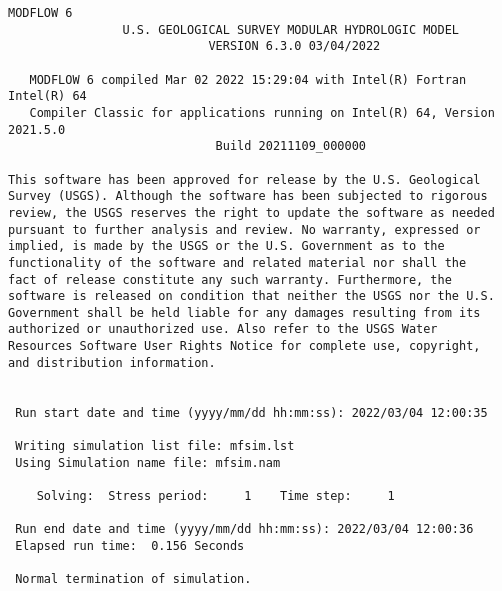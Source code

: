 {\small
\begin{lstlisting}[style=modeloutput]
                                   MODFLOW 6
                U.S. GEOLOGICAL SURVEY MODULAR HYDROLOGIC MODEL
                            VERSION 6.3.0 03/04/2022

   MODFLOW 6 compiled Mar 02 2022 15:29:04 with Intel(R) Fortran Intel(R) 64
   Compiler Classic for applications running on Intel(R) 64, Version 2021.5.0
                             Build 20211109_000000

This software has been approved for release by the U.S. Geological
Survey (USGS). Although the software has been subjected to rigorous
review, the USGS reserves the right to update the software as needed
pursuant to further analysis and review. No warranty, expressed or
implied, is made by the USGS or the U.S. Government as to the
functionality of the software and related material nor shall the
fact of release constitute any such warranty. Furthermore, the
software is released on condition that neither the USGS nor the U.S.
Government shall be held liable for any damages resulting from its
authorized or unauthorized use. Also refer to the USGS Water
Resources Software User Rights Notice for complete use, copyright,
and distribution information.


 Run start date and time (yyyy/mm/dd hh:mm:ss): 2022/03/04 12:00:35

 Writing simulation list file: mfsim.lst
 Using Simulation name file: mfsim.nam

    Solving:  Stress period:     1    Time step:     1

 Run end date and time (yyyy/mm/dd hh:mm:ss): 2022/03/04 12:00:36
 Elapsed run time:  0.156 Seconds

 Normal termination of simulation.

\end{lstlisting}
}
